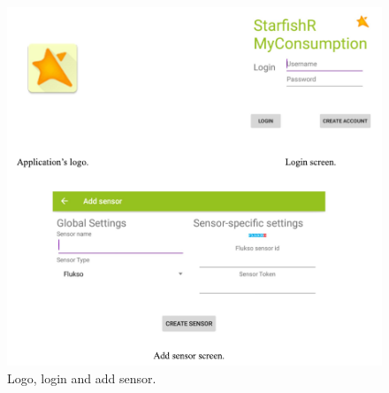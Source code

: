 \documentclass[a4paper, oneside, 11pt]{book}
\begin{document}
\begin{figure}[htbp]
	\centerline{\includegraphics[width=1\textwidth]{screenshot1.pdf}}
	\caption{Logo, login and add sensor.}
	\label{fig:screenshot1}
\end{figure}
\end{document}
